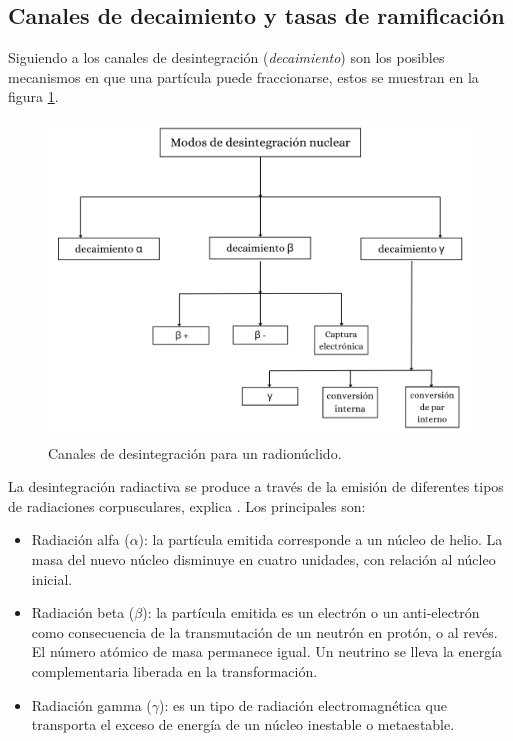 \subsection{Canales de decaimiento y tasas de ramificación}

Siguiendo a \cite{Cottingham.2001, Basdevant.2005, Krane.1987} los canales de desintegración (\textit{decaimiento}) son los posibles mecanismos en que una partícula puede fraccionarse, estos se muestran en la figura \ref{channels}.

\begin{figure}%
    \begin{center}
        \includegraphics[scale=0.5]{imagenes/decay.png}
        \caption{Canales de desintegración para un radionúclido.}\label{channels}
    \end{center}
\end{figure}

\noindent La desintegración radiactiva se produce a través de la emisión de diferentes tipos de radiaciones corpusculares, explica \cite{Krane.1987}. Los principales son: 

\begin{itemize}
	\item Radiación alfa ($\alpha $):  la partícula emitida corresponde a un núcleo de helio. La masa del nuevo núcleo disminuye en cuatro unidades, con relación al núcleo inicial. 
	
	\item Radiación beta ($\beta $): la partícula emitida es un electrón o un anti-electrón como consecuencia de la transmutación de un neutrón en protón, o al revés. El número atómico de masa permanece igual. Un neutrino  se lleva la energía complementaria liberada en la transformación. 
	
	\item Radiación gamma ($\gamma $): es un tipo de radiación electromagnética que transporta el exceso de energía de un núcleo inestable o metaestable. 
\end{itemize}


